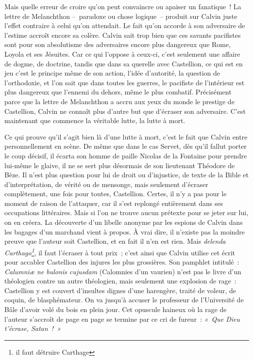 \documentclass[french,twoside]{book} %
\newcommand\foreign[1]{\emph{#1}}
\begin{document}
\noindent Mais quelle erreur de croire qu’on peut convaincre ou apaiser un fanatique ! La lettre de Melanchthon – paradoxe ou chose logique – produit sur Calvin juste l’effet contraire à celui qu’on attendait. Le fait qu’on accorde à son adversaire de l’estime accroît encore sa colère. Calvin sait trop bien que ces savants pacifistes sont pour son absolutisme des adversaires encore plus dangereux que Rome, Loyola et ses Jésuites. Car ce qui l’oppose à ceux-ci, c’est seulement une affaire de dogme, de doctrine, tandis que dans sa querelle avec Castellion, ce qui est en jeu c’est le principe même de son action, l’idée d’autorité, la question de l’orthodoxie, et l’on sait que dans toutes les guerres, le pacifiste de l’intérieur est plus dangereux que l’ennemi du dehors, même le plus combatif. Précisément parce que la lettre de Melanchthon a accru aux yeux du monde le prestige de Castellion, Calvin ne connaît plus d’autre but que d’écraser son adversaire. C’est maintenant que commence la véritable lutte, la lutte à mort.\par
Ce qui prouve qu’il s’agit bien là d’une lutte à mort, c’est le fait que Calvin entre personnellement en scène. De même que dans le cas Servet, dès qu’il fallut porter le coup décisif, il écarta son homme de paille Nicolas de la Fontaine pour prendre lui-même le glaive, il ne se sert plus désormais de son lieutenant Théodore de Bèze. Il n’est plus question pour lui de droit ou d’injustice, de texte de la Bible et d’interprétation, de vérité ou de mensonge, mais seulement d’écraser complètement, une fois pour toutes, Castellion. Certes, il n’y a pas pour le moment de raison de l’attaquer, car il s’est replongé entièrement dans ses occupations littéraires. Mais si l’on ne trouve aucun prétexte pour se jeter sur lui, on en créera. La découverte d’un libelle anonyme par les espions de Calvin dans les bagages d’un marchand vient à propos. À vrai dire, il n’existe pas la moindre preuve que l’auteur soit Castellion, et en fait il n’en est rien. Mais \foreign{delenda Carthago\footnote{il faut détruire Carthage}}, il faut l’écraser à tout prix ; c’est ainsi que Calvin utilise cet écrit pour accabler Castellion des injures les plus grossières. Son pamphlet intitulé : \emph{Calumniæ ne bulonis cujusdam} (Calomnies d’un vaurien) n’est pas le livre d’un théologien contre un autre théologien, mais seulement une explosion de rage : Castellion y est couvert d’insultes dignes d’une harengère, traité de voleur, de coquin, de blasphémateur. On va jusqu’à accuser le professeur de l’Université de Bâle d’avoir volé du bois en plein jour. Cet opuscule haineux où la rage de l’auteur s’accroît de page en page se termine par ce cri de fureur : \emph{« Que Dieu t’écrase, Satan ! »}\par
\end{document}
